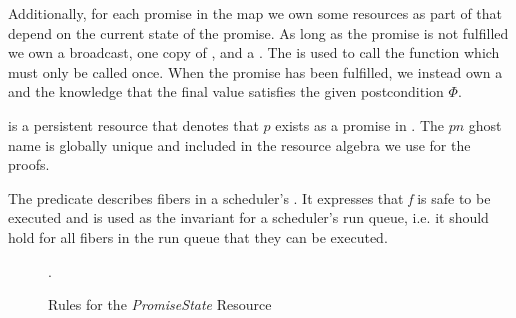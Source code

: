 Additionally, for each promise in the map we own some resources as part of \gsPInvIn{} that depend on the current state of the promise.
As long as the promise is not fulfilled we own a broadcast, one copy of \gspwait{}, and a \gssignal{}.
The \gssignal{} is used to call the  function which must only be called once.
When the promise has been fulfilled, we instead own a \gspdone{} and the knowledge that the final value satisfies the given postcondition \(Φ\).

\gsIsPr{} is a persistent resource that denotes that \(p\) exists as a promise in \gsPInvIn{}. The \(pn\) ghost name is globally unique and included in the resource algebra we use for the proofs.

The \gsReady{} predicate describes fibers in a scheduler's .
It expresses that \textit{f} is safe to be executed and is used as the invariant for a scheduler's run queue, i.e. it should hold for all fibers in the run queue that they can be executed.

\begin{figure}
  \caption{Rules for the \textit{PromiseState} Resource}.
  \label{fig:promise-state-rules}
\end{figure}


